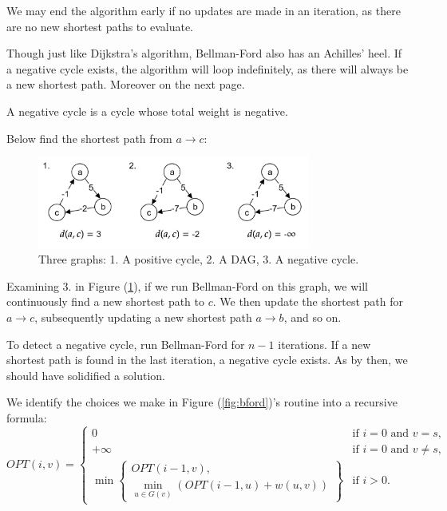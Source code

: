 \begin{theo}

    We may end the algorithm early if no updates are made in an iteration, as there are no new shortest paths to evaluate.
\end{theo}
\noindent
Though just like Dijkstra's algorithm, Bellman-Ford also has an Achilles' heel. If a negative cycle exists, the algorithm will 
loop indefinitely, as there will always be a new shortest path. Moreover on the next page.

\begin{Def}

    A negative cycle is a cycle whose total weight is negative.
\end{Def}

\noindent
Below find the shortest path from $a\to c$:
\begin{figure}[h]
    \centering
    \includegraphics[width=0.8\textwidth]{Sections/dp/negcyc.png}
    \caption{Three graphs: 1. A positive cycle, 2. A DAG, 3. A negative cycle.}
    \label{fig:ncycle}
\end{figure}

\noindent
Examining 3. in Figure (\ref{fig:ncycle}), if we run Bellman-Ford on this graph, we will continuously find a new shortest path to $c$.
We then update the shortest path for $a\to c$, subsequently updating a new shortest path $a\to b$, and so on.
\begin{theo}

    To detect a negative cycle, run Bellman-Ford for $n-1$ iterations. If a new shortest path is found in the last iteration, a negative cycle exists. As by then,
    we should have solidified a solution.
\end{theo}
\noindent
We identify the choices we make in Figure (\ref{fig:bford})'s routine into a recursive formula:
\[
OPT(i, v) = 
\begin{cases} 
0 & \text{if } i = 0 \text{ and } v = s, \\ 
+\infty & \text{if } i = 0 \text{ and } v \neq s, \\
\min \left\{ 
\begin{array}{l}
OPT(i - 1, v), \\
\min\limits_{u \in G(v)} \left( OPT(i - 1, u) + w(u, v) \right)
\end{array} 
\right\} & \text{if } i > 0.
\end{cases}
\]

